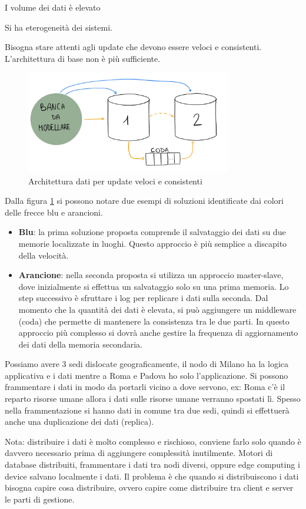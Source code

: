 I volume dei dati è elevato

Si ha eterogeneità dei sistemi.

Bisogna stare attenti agli update che devono essere veloci e consistenti.
L'architettura di base non è più sufficiente.
\begin{figure}[!ht]
      \centering
      \includegraphics[width=0.8\textwidth]{./img/modellazione_banca.jpg}
      \caption{Architettura dati per update veloci e consistenti}
      \label{fig:esBanca}
\end{figure}

Dalla figura \ref{fig:esBanca} si possono notare due esempi di soluzioni
identificate dai colori delle frecce blu e arancioni.
\begin{itemize}
      \item \textbf{Blu}: la prima soluzione proposta comprende il salvataggio
            dei dati su due memorie localizzate in luoghi. Questo approccio è più
            semplice a discapito della velocità.
      \item \textbf{Arancione}: nella seconda proposta si utilizza un approccio
            master-slave, dove inizialmente si effettua un salvataggio solo su una
            prima memoria. Lo step successivo è sfruttare i log per replicare i
            dati sulla seconda. Dal momento che la quantità dei dati è elevata,
            si può aggiungere un middleware (coda) che permette di mantenere la
            consistenza tra le due parti. In questo approccio più complesso si
            dovrà anche gestire la frequenza di aggiornamento dei dati della
            memoria secondaria.
\end{itemize}


Possiamo avere 3 sedi dislocate geograficamente, il nodo di Milano ha la logica
applicativa e i dati mentre a Roma e Padova ho solo l'applicazione. Si possono
frammentare i dati in modo da portarli vicino a dove servono, ex: Roma c'è il
reparto risorse umane allora i dati sulle risorse umane verranno spostati lì.
Spesso nella frammentazione si hanno dati in comune tra due sedi, quindi si
effettuerà anche una duplicazione dei dati (replica).

Nota: distribuire
i dati è molto complesso e rischioso, conviene farlo solo quando è davvero
necessario prima di aggiungere complessità inutilmente. Motori di database
distribuiti, frammentare i dati tra nodi diversi, oppure edge computing i device
salvano localmente i dati. Il problema è che quando si distribuiscono i dati
bisogna capire cosa distribuire, ovvero capire come distribuire tra client e
server le parti di gestione.
